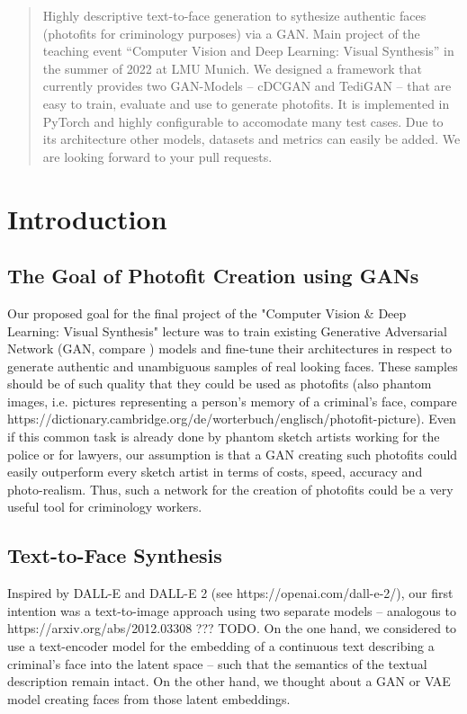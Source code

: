 \documentclass[12pt, a4paper]{article}
\begin{document}
\begin{abstract}
Highly descriptive text-to-face generation to sythesize authentic faces (photofits for criminology purposes) via a GAN. Main project of the  teaching event ``Computer Vision and Deep Learning: Visual Synthesis'' in the summer of 2022 at LMU Munich.
We designed a framework that currently provides two GAN-Models -- cDCGAN and TediGAN -- that are easy to train, evaluate and use to generate photofits. It is implemented in PyTorch and highly configurable to accomodate many test cases. Due to its architecture other models, datasets and metrics can easily be added. We are looking forward to your pull requests.

\end{abstract}
\tableofcontents

\section{Introduction}

\subsection{The Goal of Photofit Creation using GANs}
\label{sec:goal}
Our proposed goal for the final project of the "Computer Vision \& Deep Learning: Visual Synthesis" lecture was to train 
existing Generative Adversarial Network (GAN, compare \cite{gan}) models and fine-tune their architectures in respect to generate authentic
and unambiguous samples of real looking faces. These samples should be of such quality that they could be used as
photofits (also phantom images, i.e. pictures representing a person's memory of a criminal's face, compare 
https://dictionary.cambridge.org/de/worterbuch/englisch/photofit-picture). Even if this common task is already done
by phantom sketch artists working for the police or for lawyers, our assumption is that a GAN creating such photofits
could easily outperform every sketch artist in terms of costs, speed, accuracy and photo-realism. Thus, such a network
for the creation of photofits could be a very useful tool for criminology workers.

\subsection{Text-to-Face Synthesis}
Inspired by DALL-E and DALL-E 2 (see https://openai.com/dall-e-2/), our first intention was a text-to-image approach
using two separate models -- analogous to https://arxiv.org/abs/2012.03308 ??? TODO. On the one hand, we considered to
use a text-encoder model for the embedding of a continuous text describing a criminal's face into the latent space --
such that the semantics of the textual description remain intact. On the other hand, we thought about a GAN or VAE model
creating faces from those latent embeddings.
\end{document}
